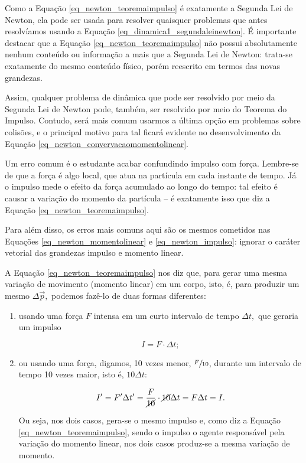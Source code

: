 
Como a Equação \eqref{eq_newton_teoremaimpulso} é exatamente a Segunda Lei de Newton, ela pode ser usada para resolver quaisquer problemas que antes resolvíamos usando a Equação \eqref{eq_dinamica1_segundaleinewton}.  É importante destacar que a Equação \eqref{eq_newton_teoremaimpulso} não possui absolutamente nenhum conteúdo ou informação a mais que a Segunda Lei de Newton: trata-se exatamente do mesmo conteúdo físico, porém reescrito em termos das novas grandezas.

Assim, qualquer problema de dinâmica que pode ser resolvido por meio da Segunda Lei de Newton pode, também, ser resolvido por meio do Teorema do Impulso. Contudo, será mais comum usarmos a última opção em problemas sobre colisões, e o principal motivo para tal ficará evidente no desenvolvimento da Equação \eqref{eq_newton_convervacaomomentolinear}.



Um erro comum é o estudante acabar confundindo impulso com força. Lembre-se de que a força é algo local, que atua na partícula em cada instante de tempo. Já o impulso mede o efeito da força acumulado ao longo do tempo: tal efeito é causar a variação do momento da partícula -- é exatamente isso que diz a Equação \eqref{eq_newton_teoremaimpulso}.


Para além disso, os erros mais comuns aqui são os mesmos cometidos nas Equações \eqref{eq_newton_momentolinear} e \eqref{eq_newton_impulso}: ignorar o caráter vetorial das grandezas impulso e momento linear.



A Equação \eqref{eq_newton_teoremaimpulso} nos diz que, para gerar uma mesma variação de movimento (momento linear) em um corpo, isto, é, para produzir um mesmo $\Delta \vec p,$ podemos fazê-lo de duas formas diferentes:

\begin{enumerate}
    \item [(i)] usando uma força $F$ intensa em um curto intervalo de tempo $\Delta t,$ que geraria um impulso

     $$ I = F \cdot \Delta t;$$

     \item [(ii)] ou usando uma força, digamos, 10 vezes menor, $\sfrac{F}{10}$, durante um intervalo de tempo 10 vezes maior, isto é, $10 \Delta t:$

     $$ I' = F'\Delta t'=  \dfrac{F}{\cancel {10}} \cdot \cancel {10} \Delta t = F \Delta t = I.$$

     Ou seja, nos dois casos, gera-se o mesmo impulso e, como diz a Equação \eqref{eq_newton_teoremaimpulso}, sendo o impulso o agente responsável pela variação do momento linear, nos dois casos produz-se a mesma variação de momento.
\end{enumerate}

